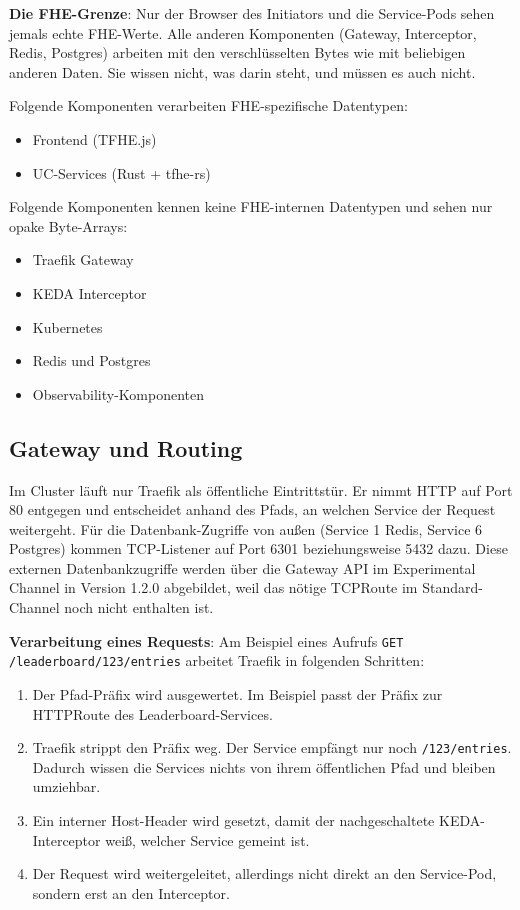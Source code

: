\textbf{Die FHE-Grenze}:
Nur der Browser des Initiators und die Service-Pods sehen jemals echte FHE-Werte. Alle anderen Komponenten (Gateway, Interceptor, Redis, Postgres) arbeiten mit den verschlüsselten Bytes wie mit beliebigen anderen Daten. Sie wissen nicht, was darin steht, und müssen es auch nicht.

Folgende Komponenten verarbeiten FHE-spezifische Datentypen:
\begin{itemize}
    \item Frontend (TFHE.js)
    \item UC-Services (Rust + tfhe-rs)
\end{itemize}

Folgende Komponenten kennen keine FHE-internen Datentypen und sehen nur opake Byte-Arrays:
\begin{itemize}
    \item Traefik Gateway
    \item KEDA Interceptor
    \item Kubernetes
    \item Redis und Postgres
    \item Observability-Komponenten
\end{itemize}

\subsection{Gateway und Routing}
\label{sub:gateway_und_routing}

Im Cluster läuft nur Traefik als öffentliche Eintrittstür. Er nimmt HTTP auf Port 80 entgegen und entscheidet anhand des Pfads, an welchen Service der Request weitergeht. Für die Datenbank-Zugriffe von außen (Service 1 Redis, Service 6 Postgres) kommen TCP-Listener auf Port 6301 beziehungsweise 5432 dazu. Diese externen Datenbankzugriffe werden über die Gateway API im Experimental Channel in Version 1.2.0 abgebildet, weil das nötige TCPRoute im Standard-Channel noch nicht enthalten ist.

\textbf{Verarbeitung eines Requests}:
Am Beispiel eines Aufrufs \verb|GET /leaderboard/123/entries| arbeitet Traefik in folgenden Schritten:

\begin{enumerate}
    \item Der Pfad-Präfix wird ausgewertet. Im Beispiel passt der Präfix zur HTTPRoute des Leaderboard-Services.
    \item Traefik strippt den Präfix weg. Der Service empfängt nur noch \verb|/123/entries|. Dadurch wissen die Services nichts von ihrem öffentlichen Pfad und bleiben umziehbar.
    \item Ein interner Host-Header wird gesetzt, damit der nachgeschaltete KEDA-Interceptor weiß, welcher Service gemeint ist.
    \item Der Request wird weitergeleitet, allerdings nicht direkt an den Service-Pod, sondern erst an den Interceptor.
\end{enumerate}

